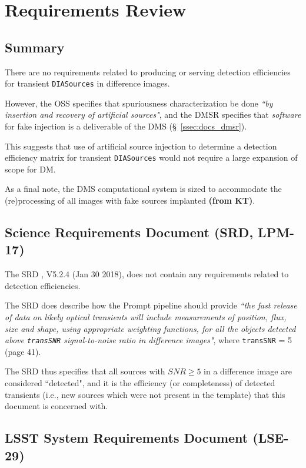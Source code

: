 \section{Requirements Review}\label{sec:docs}

\subsection{Summary}

There are no requirements related to producing or serving detection efficiencies for transient {\tt DIASources} in difference images.

However, the OSS specifies that spuriousness characterization be done {\it ``by insertion and recovery of artificial sources"}, and the DMSR specifies that {\it software} for fake injection is a deliverable of the DMS (\S~\ref{ssec:docs_dmsr}).

This suggests that use of artificial source injection to determine a detection efficiency matrix for transient {\tt DIASources} would not require a large expansion of scope for DM.

As a final note, the DMS computational system is sized to accommodate the (re)processing of all images with fake sources implanted {\bf (from KT)}.

\subsection{Science Requirements Document (SRD, LPM-17)}

The SRD , V5.2.4 (Jan 30 2018), does not contain any requirements related to detection efficiencies.

The SRD does describe how the Prompt pipeline should provide {\it ``the fast release of data on likely optical transients will include measurements of position, flux, size and shape, using appropriate weighting functions, for all the objects detected above {\tt transSNR} signal-to-noise ratio in difference images"}, where {\tt transSNR} = 5 (page 41).

The SRD thus specifies that all sources with $SNR \geq 5$ in a difference image are considered ``detected", and it is the efficiency (or completeness) of detected transients (i.e., new sources which were not present in the template) that this document is concerned with.

\subsection{LSST System Requirements Document (LSE-29)}

